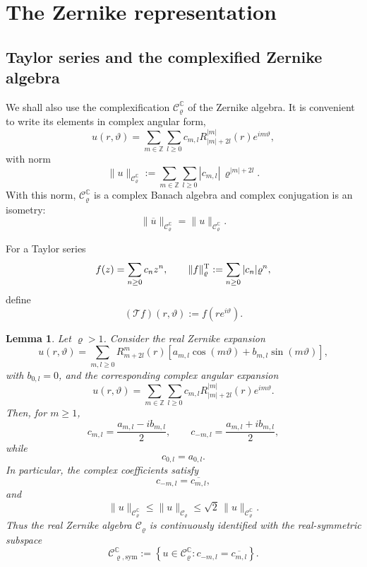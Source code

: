 \documentclass[11pt,a4paper]{amsart}
\newtheorem{lemma}[theorem]{Lemma}
\begin{document}
\section{The Zernike representation}
\label{sec:appendix-zernike}

\subsection{Taylor series and the complexified Zernike algebra}

We shall also use the complexification
$\mathcal C_\varrho^{\mathbb C}$ of the Zernike algebra. It is
convenient to write its elements in complex angular form,
\[
u(r,\vartheta)
=
\sum_{m\in\mathbb Z}
\sum_{l\ge0}
c_{m,l}
R_{|m|+2l}^{|m|}(r)e^{im\vartheta},
\]
with norm
\begin{equation}\label{eq:complex-zernike-norm}
	\|u\|_{\mathcal C_\varrho^{\mathbb C}}
	:=
	\sum_{m\in\mathbb Z}
	\sum_{l\ge0}
	|c_{m,l}|\,
	\varrho^{|m|+2l}.
\end{equation}
With this norm, $\mathcal C_\varrho^{\mathbb C}$ is a complex Banach
algebra and complex conjugation is an isometry:
\begin{equation}\label{eq:zernike-conjugation}
	\|\overline u\|_{\mathcal C_\varrho^{\mathbb C}}
	=
	\|u\|_{\mathcal C_\varrho^{\mathbb C}}.
\end{equation}

For a Taylor series
\[
f(z)=\sum_{n\ge0}c_nz^n,
\qquad
\|f\|_\varrho^{\rm T}
:=
\sum_{n\ge0}|c_n|\varrho^n,
\]
define
\[
(\mathcal T f)(r,\vartheta)
:=
f(re^{i\vartheta}).
\]
\begin{lemma}\label{lem:zernike-real-complex}
	Let $\varrho>1$. Consider the real Zernike expansion
	\[
	u(r,\vartheta)
	=
	\sum_{m,l\ge 0}
	R_{m+2l}^{m}(r)
	\left[
	a_{m,l}\cos(m\vartheta)
	+
	b_{m,l}\sin(m\vartheta)
	\right],
	\]
	with $b_{0,l}=0$, and the corresponding complex angular expansion
	\[
	u(r,\vartheta)
	=
	\sum_{m\in\mathbb Z}
	\sum_{l\ge 0}
	c_{m,l}
	R_{|m|+2l}^{|m|}(r)e^{im\vartheta}.
	\]
	Then, for $m\ge1$,
	\[
	c_{m,l}=\frac{a_{m,l}-ib_{m,l}}{2},
	\qquad
	c_{-m,l}=\frac{a_{m,l}+ib_{m,l}}{2},
	\]
	while
	\[
	c_{0,l}=a_{0,l}.
	\]
	In particular, the complex coefficients satisfy
	\[
	c_{-m,l}=\overline{c_{m,l}},
	\]
	and
	\[
	\|u\|_{\mathcal C_\varrho^{\mathbb C}}
	\le
	\|u\|_{\mathcal C_\varrho}
	\le
	\sqrt2\,
	\|u\|_{\mathcal C_\varrho^{\mathbb C}}.
	\]
	Thus the real Zernike algebra $\mathcal C_\varrho$ is continuously
	identified with the real-symmetric subspace
	\[
	\mathcal C_{\varrho,\mathrm{sym}}^{\mathbb C}
	:=
	\left\{
	u\in\mathcal C_\varrho^{\mathbb C}:
	c_{-m,l}=\overline{c_{m,l}}
	\right\}.
	\]
\end{lemma}
\end{document}
